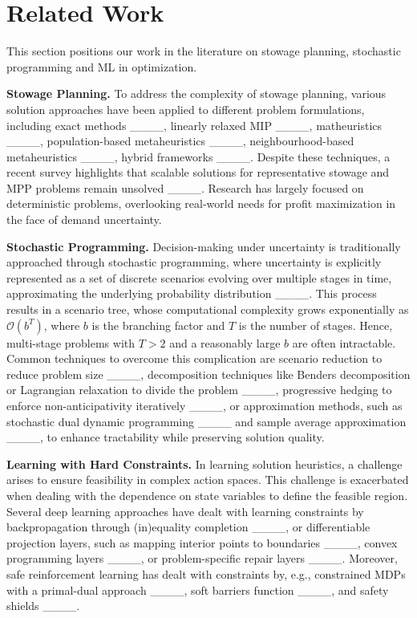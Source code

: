 \section{Related Work}
This section positions our work in the literature on stowage planning, stochastic programming and ML in optimization.  

\textbf{Stowage Planning.} To address the complexity of stowage planning, various solution approaches have been applied to different problem formulations, including exact methods ____, linearly relaxed MIP ____, matheuristics ____, population-based metaheuristics ____, neighbourhood-based metaheuristics ____, hybrid frameworks ____. 
Despite these techniques, a recent survey highlights that scalable solutions for representative stowage and MPP problems remain unsolved ____. Research has largely focused on deterministic problems, overlooking real-world needs for profit maximization in the face of demand uncertainty. 

\textbf{Stochastic Programming.} Decision-making under uncertainty is traditionally approached through stochastic programming, where uncertainty is explicitly represented as a set of discrete scenarios evolving over multiple stages in time, approximating the underlying probability distribution ____. This process results in a scenario tree, whose computational complexity grows exponentially as $\mathcal{O}(b^T)$, where $b$ is the branching factor and $T$ is the number of stages. Hence, multi-stage problems with $T > 2$ and a reasonably large $b$ are often intractable. Common techniques to overcome this complication are scenario reduction to reduce problem size ____, decomposition techniques like Benders decomposition or Lagrangian relaxation to divide the problem ____, progressive hedging to enforce non-anticipativity iteratively ____, or approximation methods, such as stochastic dual dynamic programming ____ and sample average approximation ____, to enhance tractability while preserving solution quality.

\textbf{Learning with Hard Constraints.} In learning solution heuristics, a challenge arises to ensure feasibility in complex action spaces. This challenge is exacerbated when dealing with the dependence on state variables to define the feasible region. Several deep learning approaches have dealt with learning constraints by backpropagation through (in)equality completion ____, or differentiable projection layers, such as mapping interior points to boundaries ____,  convex programming layers ____, or problem-specific repair layers ____. Moreover, safe reinforcement learning has dealt with constraints by, e.g., constrained MDPs with a primal-dual approach ____, soft barriers function ____, and safety shields ____.